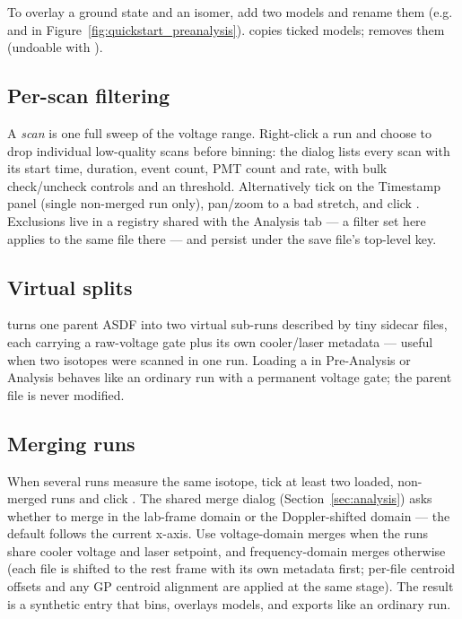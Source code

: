 To overlay a ground state and an isomer, add two models and rename
them (e.g.\  and  in
Figure~\ref{fig:quickstart_preanalysis}). 
copies ticked models;  removes them (undoable
with ).

\subsection{Per-scan filtering}
\label{sec:pa_scanfilter}

A \emph{scan} is one full sweep of the voltage range. Right-click a
run and choose  to drop individual low-quality
scans before binning: the dialog lists every scan with its start
time, duration, event count, PMT count and rate, with bulk
check/uncheck controls and an  threshold.
Alternatively tick  on the Timestamp panel (single
non-merged run only), pan/zoom to a bad stretch, and click
. Exclusions live in a registry shared
with the Analysis tab --- a filter set here applies to the same file
there --- and persist under the save file's top-level
 key.

\subsection{Virtual splits}

 turns one parent ASDF into
two virtual sub-runs described by tiny  sidecar files,
each carrying a raw-voltage gate plus its own cooler/laser metadata
--- useful when two isotopes were scanned in one run. Loading a
 in Pre-Analysis or Analysis behaves like an ordinary
run with a permanent voltage gate; the parent file is never
modified.

\subsection{Merging runs}

When several runs measure the same isotope, tick at least two loaded,
non-merged runs and click . The shared merge
dialog (Section~\ref{sec:analysis}) asks whether to merge in the
lab-frame  domain or the Doppler-shifted 
domain --- the default follows the current x-axis. Use voltage-domain
merges when the runs share cooler voltage and laser setpoint, and
frequency-domain merges otherwise (each file is shifted to the rest
frame with its own metadata first; per-file centroid offsets and any
GP centroid alignment are applied at the same stage). The result is a
synthetic entry that bins, overlays models, and exports like an
ordinary run.

